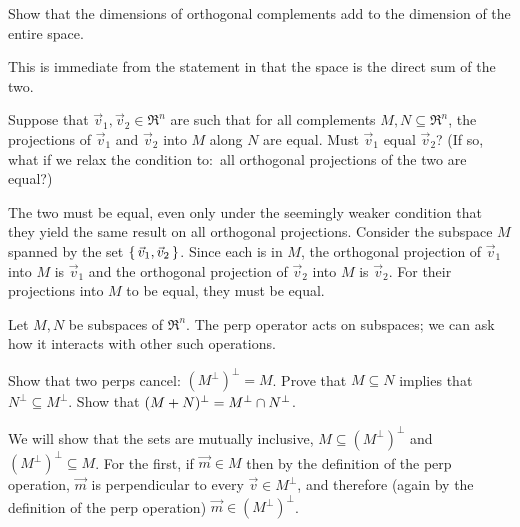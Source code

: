 \begin{exercises}
    Show that the dimensions of orthogonal complements add to the 
    dimension of the entire space.
    \begin{answer}
      This is immediate from the statement in 
       that the space is the direct sum 
      of the two.
    \end{answer}
  \recommended \item
    Suppose that \( \vec{v}_1,\vec{v}_2\in\Re^n \) are such that for all
    complements \( M,N\subseteq\Re^n \), the projections of \( \vec{v}_1 \)
    and \( \vec{v}_2 \) into \( M \) along \( N \) are equal.
    Must \( \vec{v}_1 \) equal \( \vec{v}_2 \)?
    (If so, what if we relax the condition to:~all
     orthogonal projections of the two are equal?)
    \begin{answer}
      The two must be equal, even only under the seemingly weaker
      condition that they yield the same result on all orthogonal projections.
      Consider the subspace $M$ spanned by the set 
      $\mbox{$\{\,\vec{v}_1,\vec{v}_2\,\}$}$.
      Since each is in $M$, the orthogonal projection of $\vec{v}_1$ into 
      $M$ is $\vec{v}_1$ and the orthogonal projection of $\vec{v}_2$ into
      $M$ is $\vec{v}_2$.
      For their projections into $M$ to be equal, they must be equal.
    \end{answer}
  \recommended \item \label{exer:AlgOfPerps}
    Let \( M,N \) be subspaces of \( \Re^n \).
    The perp operator acts on subspaces; we can ask how it interacts
    with other such operations.
    \begin{exparts}
      \partsitem Show that two perps cancel: \( (M^\perp)^\perp=M \).
      \partsitem %
        Prove that \( M\subseteq N \) implies
           that \( N^\perp\subseteq M^\perp \).
      \partsitem Show that \( (M+N)^\perp=M^\perp\cap N^\perp \).
    \end{exparts}
    \begin{answer}
      \begin{exparts}
        \partsitem 
          We will show that the sets are mutually inclusive,
          $M\subseteq (M^\perp)^\perp$ and $(M^\perp)^\perp \subseteq M$.
          For the first, 
          if $\vec{m}\in M$ then by the definition of the perp operation,
          $\vec{m}$ is perpendicular to every $\vec{v}\in M^\perp$,
          and therefore (again by the definition of the perp operation)
          $\vec{m}\in (M^\perp)^\perp$.

\end{exparts}
\end{answer}
\end{exercises}
